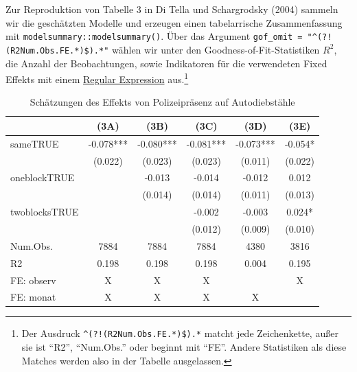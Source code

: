 \documentclass[
  a4paper,
  DIV=11,
  oneside]{scrreprt}
\newenvironment{Shaded}{\begin{snugshade}}{\end{snugshade}}
\newcommand{\AttributeTok}[1]{\textcolor[rgb]{0.40,0.45,0.13}{#1}}
\newcommand{\CommentTok}[1]{\textcolor[rgb]{0.37,0.37,0.37}{#1}}
\newcommand{\FunctionTok}[1]{\textcolor[rgb]{0.28,0.35,0.67}{#1}}
\newcommand{\NormalTok}[1]{\textcolor[rgb]{0.00,0.23,0.31}{#1}}
\newcommand{\OtherTok}[1]{\textcolor[rgb]{0.00,0.23,0.31}{#1}}
\newcommand{\StringTok}[1]{\textcolor[rgb]{0.13,0.47,0.30}{#1}}
\begin{document}
Zur Reproduktion von Tabelle 3 in Di Tella und Schargrodsky (2004)
sammeln wir die geschätzten Modelle und erzeugen einen tabelarrische
Zusammenfassung mit \texttt{modelsummary::modelsummary()}. Über das
Argument
\texttt{gof\_omit\ =\ "\^{}(?!(R2\textbar{}Num.Obs.\textbar{}FE.*)\$).*"}
wählen wir unter den Goodness-of-Fit-Statistiken \(R^2\), die Anzahl der
Beobachtungen, sowie Indikatoren für die verwendeten Fixed Effekts mit
einem \href{https://de.wikipedia.org/wiki/Regulärer_Ausdruck}{Regular
Expression} aus.\footnote{Der Ausdruck
  \texttt{\^{}(?!(R2\textbar{}Num.Obs.\textbar{}FE.*)\$).*} matcht jede
  Zeichenkette, außer sie ist ``R2'', ``Num.Obs.'' oder beginnt mit
  ``FE''. Andere Statistiken als diese Matches werden also in der
  Tabelle ausgelassen.}

\begin{Shaded}
\end{Shaded}

\begingroup
\fontsize{12.0pt}{14.4pt}\selectfont
\setlength{\LTpost}{0mm}

\begin{longtable}{lccccc}

\caption{\label{tbl-ditella3}Schätzungen des Effekts von Polizeipräsenz
auf Autodiebstähle}

\tabularnewline

\toprule
  & (3A) & (3B) & (3C) & (3D) & (3E) \\ 
\midrule\addlinespace[2.5pt]
sameTRUE & -0.078*** & -0.080*** & -0.081*** & -0.073*** & -0.054* \\ 
 & (0.022) & (0.023) & (0.023) & (0.011) & (0.022) \\ 
oneblockTRUE &  & -0.013 & -0.014 & -0.012 & 0.012 \\ 
 &  & (0.014) & (0.014) & (0.011) & (0.013) \\ 
twoblocksTRUE &  &  & -0.002 & -0.003 & 0.024* \\ 
 &  &  & (0.012) & (0.009) & (0.010) \\ 
Num.Obs. & 7884 & 7884 & 7884 & 4380 & 3816 \\ 
R2 & 0.198 & 0.198 & 0.198 & 0.004 & 0.195 \\ 
FE: observ & X & X & X &  & X \\ 
FE: monat & X & X & X & X &  \\ 
\bottomrule

\end{longtable}
\end{document}
